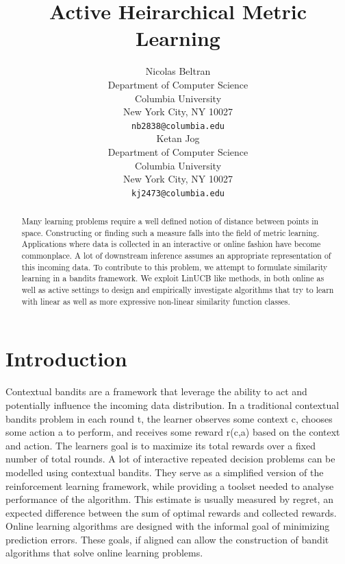 \documentclass{article}
\title{Active Heirarchical Metric Learning}
\author{
  Nicolas Beltran\\
  Department of Computer Science\\
  Columbia University\\
  New York City, NY 10027 \\
  \texttt{nb2838@columbia.edu}\\
  \And
  Ketan Jog\\
  Department of Computer Science\\
  Columbia University\\
  New York City, NY 10027 \\
  \texttt{kj2473@columbia.edu}\\
}
\begin{document}
\maketitle

\begin{abstract}
    Many learning problems require a well defined notion of distance between points in space. 
    Constructing or finding such a measure falls into the field of metric learning.
    Applications where data is collected in an interactive or online fashion have become commonplace. 
    A lot of downstream inference assumes an appropriate representation of this incoming data.
    To contribute to this problem, we attempt to formulate similarity learning in a bandits framework. 
    We exploit LinUCB like methods, in both online as well as active settings to design and empirically investigate algorithms 
    that try to learn with linear as well as more expressive non-linear similarity function classes.
\end{abstract}


\section{Introduction}
Contextual bandits are a framework that leverage the ability to act and potentially influence the incoming data distribution. In a traditional contextual bandits problem in each round t, the learner observes some context c, chooses some action a to perform, and receives some reward r(c,a) based on the context and action. The learners goal is to maximize its total rewards over a fixed number of total rounds. A lot of interactive repeated decision problems can be modelled using contextual bandits. They serve as a simplified version of the reinforcement learning framework, while providing a toolset needed to analyse performance of the algorithm. This estimate is usually measured by regret, an expected difference between the sum of optimal rewards and collected rewards. Online learning algorithms are designed with the informal goal of minimizing prediction errors. These goals, if aligned can allow the construction of bandit algorithms that solve online learning problems. \\
\end{document}
